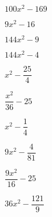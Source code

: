 \begin{esercizio}
\begin{htmulticols}{4}
\begin{enumeratea}
\item \(100 x^{2} - 169\) %
\item \(9x^{2} - 16\) %
\item \(144 x^{2} - 9\) %
\item \(144 x^{2} - 4\) %
\item \(x^{2} - \dfrac{25}{4}\) %
\item \(\dfrac{x^{2}}{36} - 25\) %
\item \(x^{2} - \dfrac{1}{4}\) %
\item \(9 x^{2} - \dfrac{4}{81}\) %
\item \(\dfrac{9 x^{2}}{16} - 25\) %
\item \(36 x^{2} - \dfrac{121}{9}\) %

\end{enumeratea}
\end{htmulticols}
\end{esercizio}
